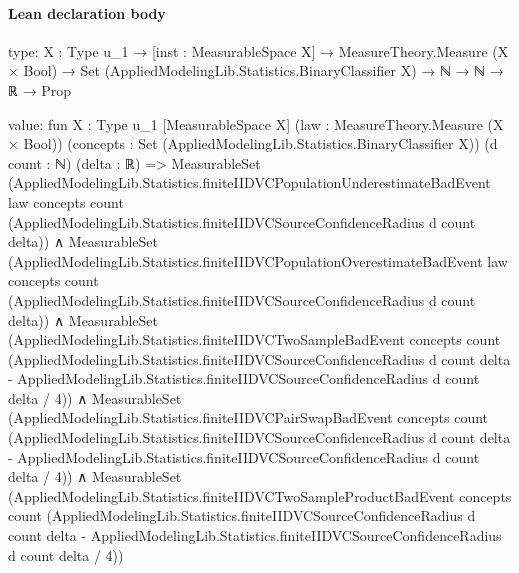 \documentclass[10pt]{article}
\begin{document}
\paragraph{Lean declaration body}
\begin{ReviewVerbatim}
type:
{X : Type u_1} →
  [inst : MeasurableSpace X] →
    MeasureTheory.Measure (X × Bool) → Set (AppliedModelingLib.Statistics.BinaryClassifier X) → ℕ → ℕ → ℝ → Prop

value:
fun {X : Type u_1} [MeasurableSpace X] (law : MeasureTheory.Measure (X × Bool))
    (concepts : Set (AppliedModelingLib.Statistics.BinaryClassifier X)) (d count : ℕ) (delta : ℝ) =>
  MeasurableSet
      (AppliedModelingLib.Statistics.finiteIIDVCPopulationUnderestimateBadEvent law concepts count
        (AppliedModelingLib.Statistics.finiteIIDVCSourceConfidenceRadius d count delta)) ∧
    MeasurableSet
        (AppliedModelingLib.Statistics.finiteIIDVCPopulationOverestimateBadEvent law concepts count
          (AppliedModelingLib.Statistics.finiteIIDVCSourceConfidenceRadius d count delta)) ∧
      MeasurableSet
          (AppliedModelingLib.Statistics.finiteIIDVCTwoSampleBadEvent concepts count
            (AppliedModelingLib.Statistics.finiteIIDVCSourceConfidenceRadius d count delta -
              AppliedModelingLib.Statistics.finiteIIDVCSourceConfidenceRadius d count delta / 4)) ∧
        MeasurableSet
            (AppliedModelingLib.Statistics.finiteIIDVCPairSwapBadEvent concepts count
              (AppliedModelingLib.Statistics.finiteIIDVCSourceConfidenceRadius d count delta -
                AppliedModelingLib.Statistics.finiteIIDVCSourceConfidenceRadius d count delta / 4)) ∧
          MeasurableSet
            (AppliedModelingLib.Statistics.finiteIIDVCTwoSampleProductBadEvent concepts count
              (AppliedModelingLib.Statistics.finiteIIDVCSourceConfidenceRadius d count delta -
                AppliedModelingLib.Statistics.finiteIIDVCSourceConfidenceRadius d count delta / 4))
\end{ReviewVerbatim}
\end{document}
